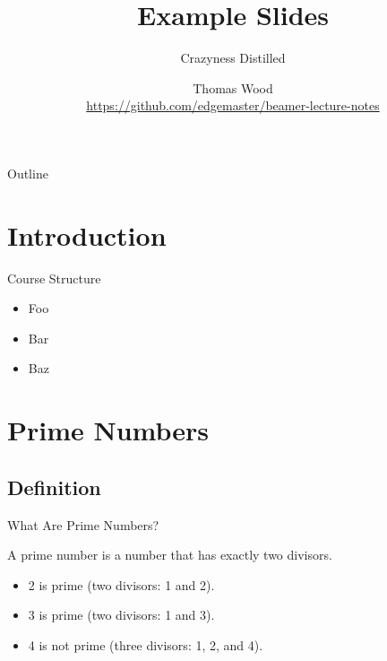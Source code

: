 \usepackage{tikz}
\usepackage{lipsum}

\title{Example Slides}
\subtitle{Crazyness Distilled}
\author[Thomas Wood]{Thomas Wood \\ \url{https://github.com/edgemaster/beamer-lecture-notes}}
\institute{}
\date{}



\begin{frame}
  \maketitle
\end{frame}

\begin{frame}{Outline}
  \tableofcontents
\end{frame}

\section{Introduction}
\begin{frame}{Course Structure}
  \begin{itemize}
    \item Foo
    \item Bar
    \item Baz
  \end{itemize}
\end{frame}
\lipsum[1]   %


\section{Prime Numbers}
\subsection{Definition}
\begin{frame}{What Are Prime Numbers?}
  \begin{definition}
    A \alert{prime number} is a number that has exactly two divisors.
  \end{definition}
  \begin{example}
    \begin{itemize}
      \item 2 is prime (two divisors: 1 and 2).
      \item 3 is prime (two divisors: 1 and 3).
      \item 4 is not prime (\alert{three} divisors: 1, 2, and 4).
    \end{itemize}
  \end{example}
\end{frame}

